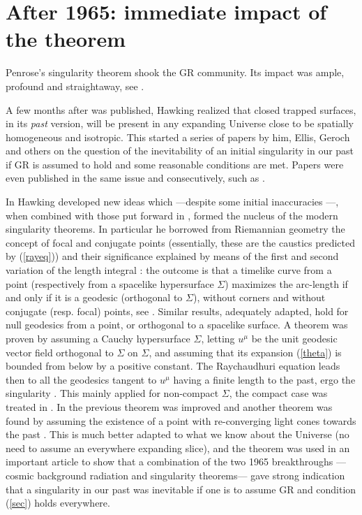 \documentclass[12pt]{iopart}
\begin{document}
\section{After 1965: immediate impact of the theorem}\label{sec:impact}
Penrose's  singularity theorem shook the GR community. Its impact was ample, profound and straightaway, see \cite{Ell1,TCE}.

A few months after \cite{P} was published, Hawking \cite{H0} realized that closed trapped surfaces, in its {\em past} version, will be present in any expanding Universe close to be spatially homogeneous and isotropic. This started a series of papers by him, Ellis, Geroch and others on the question of the inevitability of an initial singularity in our past if GR is assumed to hold and some reasonable conditions are met. Papers were even published in the same issue and consecutively, such as \cite{H00,Ge-}. 

In \cite{H1,H2,H3} Hawking developed new ideas which ---despite some initial inaccuracies \cite{TCE}---, when combined with those put forward in \cite{P}, formed the nucleus of the modern singularity theorems. In particular he borrowed from Riemannian geometry the concept of focal and conjugate points (essentially, these are the caustics predicted by (\ref{rayeq})) and their significance explained by means of the first and second variation of the length integral \cite{H1}: the outcome is that a timelike curve from a point (respectively from a spacelike hypersurface $\Sigma$) maximizes the arc-length if and only if it is a geodesic (orthogonal to $\Sigma$), without corners and without conjugate (resp. focal) points, see \cite{BE,O,HE,Kri,S1,Wald}. Similar results, adequately adapted, hold for null geodesics from a point, or orthogonal to a spacelike surface. A theorem was proven by assuming a Cauchy hypersurface $\Sigma$, letting $u^\mu$ be the unit geodesic vector field orthogonal to $\Sigma$ on $\Sigma$, and assuming that its expansion (\ref{theta}) is bounded from below by a positive constant. The Raychaudhuri equation leads then to all the geodesics tangent to $u^\mu$ having a finite length to the past, ergo the singularity \cite{H1,HE,S1}. This mainly applied for non-compact $\Sigma$, the compact case was treated in \cite{H2}. In \cite{H3} the previous theorem was improved and another theorem was found by assuming the existence of a point with re-converging light cones towards the past \cite{H3}. This is much better adapted to what we know about the Universe (no need to assume an everywhere expanding slice), and the theorem was used in an important article \cite{HE3} to show that a combination of the two 1965 breakthroughs ---cosmic background radiation and singularity theorems--- gave strong indication that a singularity in our past was inevitable if one is to assume GR and condition (\ref{sec}) holds everywhere.
\end{document}
